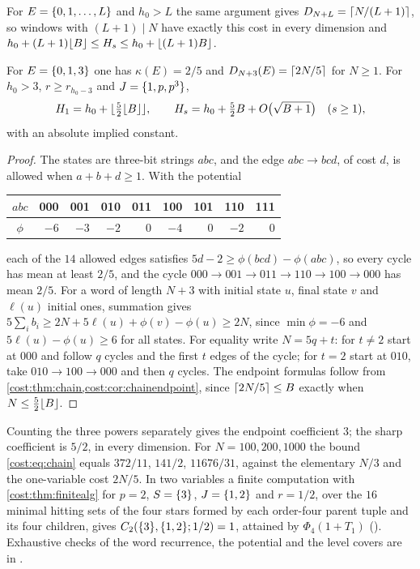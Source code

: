 For $E=\{0,1,\dots,L\}$ and $h_0>L$ the same argument gives $D_{N+L}=\lceil N/(L+1)\rceil$, so
windows with $(L+1)\mid N$ have exactly this cost in every dimension and
$h_0+(L+1)\lfloor B\rfloor\le H_s\le h_0+\lfloor(L+1)B\rfloor$.

\begin{theorem}\label{cost:thm:zeroonethree}
For $E=\{0,1,3\}$ one has $\kappa(E)=2/5$ and $D_{N+3}(E)=\lceil2N/5\rceil$ for $N\ge1$. For
$h_0>3$, $r\ge r_{h_0-3}$ and $J=\{1,p,p^3\}$,
\[
 H_1=h_0+\lfloor\tfrac52\lfloor B\rfloor\rfloor,\qquad H_s=h_0+\tfrac52B+O\bigl(\sqrt{B+1}\bigr)\quad(s\ge1),
\]
with an absolute implied constant.
\end{theorem}

\begin{proof}
The states are three-bit strings $abc$, and the edge $abc\to bcd$, of cost $d$, is allowed
when $a+b+d\ge1$. With the potential
\begin{center}
\begin{tabular}{c|rrrrrrrr}
$abc$&000&001&010&011&100&101&110&111\\\midrule
$\phi$&$-6$&$-3$&$-2$&$0$&$-4$&$0$&$-2$&$0$
\end{tabular}
\end{center}
each of the $14$ allowed edges satisfies $5d-2\ge\phi(bcd)-\phi(abc)$, so every cycle has
mean at least $2/5$, and the cycle $000\to001\to011\to110\to100\to000$ has mean $2/5$. For
a word of length $N+3$ with initial state $u$, final state $v$ and $\ell(u)$ initial ones,
summation gives $5\sum_ib_i\ge2N+5\ell(u)+\phi(v)-\phi(u)\ge2N$, since $\min\phi=-6$ and
$5\ell(u)-\phi(u)\ge6$ for all states. For equality write $N=5q+t$: for $t\ne2$ start at
$000$ and follow $q$ cycles and the first $t$ edges of the cycle; for $t=2$ start at $010$,
take $010\to100\to000$ and then $q$ cycles. The endpoint formulas follow from
\cref{cost:thm:chain,cost:cor:chainendpoint}, since $\lceil2N/5\rceil\le B$ exactly when
$N\le\frac52\lfloor B\rfloor$.
\end{proof}

Counting the three powers separately gives the endpoint coefficient $3$; the sharp
coefficient is $5/2$, in every dimension. For $N=100,200,1000$ the bound
\eqref{cost:eq:chain} equals $372/11$, $141/2$, $11676/31$, against the elementary $N/3$ and
the one-variable cost $2N/5$. In two variables a finite computation with
\cref{cost:thm:finitealg} for $p=2$, $S=\{3\}$, $J=\{1,2\}$ and $r=1/2$, over the $16$
minimal hitting sets of the four stars formed by each order-four parent tuple and its four
children, gives $C_2(\{3\},\{1,2\};1/2)=1$, attained by $\Phi_4(1+T_1)$
(). Exhaustive checks of the word recurrence,
the potential and the level covers are in .

